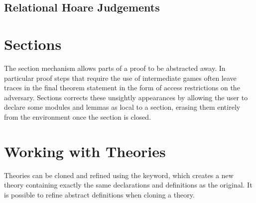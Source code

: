 %
%

\subsection{Relational Hoare Judgements}

\section{Sections}
The section mechanism allows parts of a proof to be abstracted away. In
particular proof steps that require the use of intermediate games often leave
traces in the final theorem statement in the form of access restrictions on the
adversary. Sections corrects these unsightly appearances by allowing the user
to declare some modules and lemmas as local to a section, erasing them entirely
from the environment once the section is closed.


\section{Working with Theories\label{sec:cloning}}

Theories can be cloned and refined using the  keyword, which creates
a new theory containing exactly the same declarations and definitions as the
original. It is possible to refine abstract definitions when cloning a theory.





